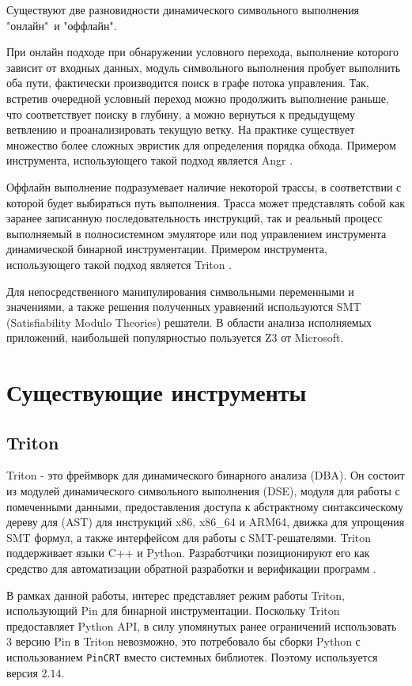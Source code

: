 Существуют две разновидности динамического символьного выполнения "онлайн"\ и "оффлайн".

При онлайн подходе при обнаружении условного перехода, выполнение которого зависит от входных данных, модуль символьного выполнения пробует выполнить оба пути, фактически производится поиск в графе потока управления. Так, встретив очередной условный переход можно продолжить выполнение раньше, что соответствует поиску в глубину, а можно вернуться к предыдущему ветвлению и проанализировать текущую ветку. На практике существует множество более сложных эвристик для определения порядка обхода.
Примером инструмента, использующего такой подход является Angr \cite{Angr}.

Оффлайн выполнение подразумевает наличие некоторой трассы, в соответствии с которой будет выбираться путь выполнения. Трасса может представлять собой как заранее записанную последовательность инструкций, так и реальный процесс выполняемый в полносистемном эмуляторе или под управлением инструмента динамической бинарной инструментации.
Примером инструмента, использующего такой подход является Triton \cite{Triton}.

Для непосредственного манипулирования символьными переменными и значениями, а также решения полученных уравнений используются SMT (Satisfiability Modulo Theories) решатели. В области анализа исполняемых приложений, наибольшей популярностью пользуется Z3 \cite{Z3} от Microsoft.



\section{Существующие инструменты}


\subsection{Triton}

Triton - это фреймворк для динамического бинарного анализа (DBA). Он состоит из модулей динамического символьного выполнения (DSE), модуля для работы с помеченными данными, предоставления доступа к абстрактному синтаксическому дереву для (AST) для инструкций x86, x86\_64 и ARM64, движка для упрощения SMT формул, а также интерфейсом для работы с SMT-решателями. Triton поддерживает языки C++ и Python.
Разработчики позиционируют его как средство для автоматизации обратной разработки и верификации программ \cite{Triton}.

В рамках данной работы, интерес представляет режим работы Triton, использующий Pin для бинарной инструментации. Поскольку Triton предоставляет Python API, в силу упомянутых ранее ограничений  использовать $3$ версию Pin в Triton невозможно, это потребовало бы сборки Python с использованием \texttt{PinCRT} вместо системных библиотек. Поэтому используется версия $2.14$.

